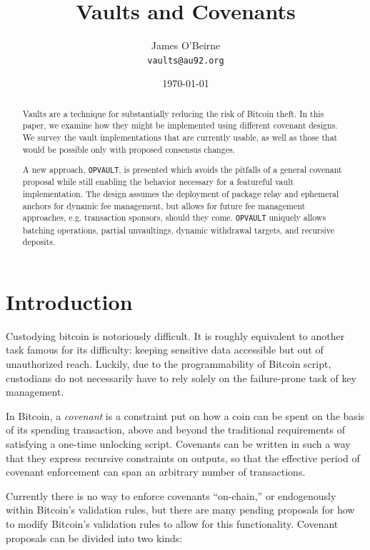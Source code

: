 \documentclass[10pt]{article}
\author{James O'Beirne \\
  \texttt{vaults@au92.org}
}
\date{\today}
\title{Vaults and Covenants}
\begin{document}
\newcommand{\ctv}{\texttt{OP\textunderscore{}CHECKTEMPLATEVERIFY}}
\newcommand{\opv}{\texttt{OP\textunderscore{}VAULT}}
\newcommand{\opuv}{\texttt{OP\textunderscore{}UNVAULT}}
\newcommand{\spk}{\code{scriptPubKey}}
\newcommand{\code}[1]{\texttt{#1}}


\maketitle
\begin{abstract}

  Vaults are a technique for substantially reducing the risk of Bitcoin theft. In this
  paper, we examine how they might be implemented using different covenant designs. We
  survey the vault implementations that are currently usable, as well as those that
  would be possible only with proposed consensus changes. 

  A new approach, \opv{}, is presented which avoids the pitfalls of a general covenant
  proposal while still enabling the behavior necessary for a featureful vault
  implementation. The design assumes the deployment of package relay and ephemeral
  anchors for dynamic fee management, but allows for future fee management approaches,
  e.g. transaction sponsors, should they come. \opv{} uniquely allows batching operations,
  partial unvaultings, dynamic withdrawal targets, and recursive deposits.

\end{abstract}

\section*{Introduction}

Custodying bitcoin is notoriously difficult. It is roughly equivalent to
another task famous for its difficulty: keeping sensitive data accessible but out
of unauthorized reach. Luckily, due to the programmability of Bitcoin script,
custodians do not necessarily have to rely solely on the failure-prone task of key
management.

In Bitcoin, a \emph{covenant} is a constraint put on how a coin can be spent on the
basis of its spending transaction, above and beyond the traditional
requirements of satisfying a one-time unlocking script. Covenants can be written in
such a way that they express recursive constraints on outputs, so that the effective
period of covenant enforcement can span an arbitrary number of transactions. 

Currently there is no way to enforce covenants ``on-chain,'' or endogenously within
Bitcoin's validation rules, but there are many pending proposals for how to modify
Bitcoin's validation rules to allow for this functionality. Covenant proposals can be
divided into two kinds:
\end{document}
